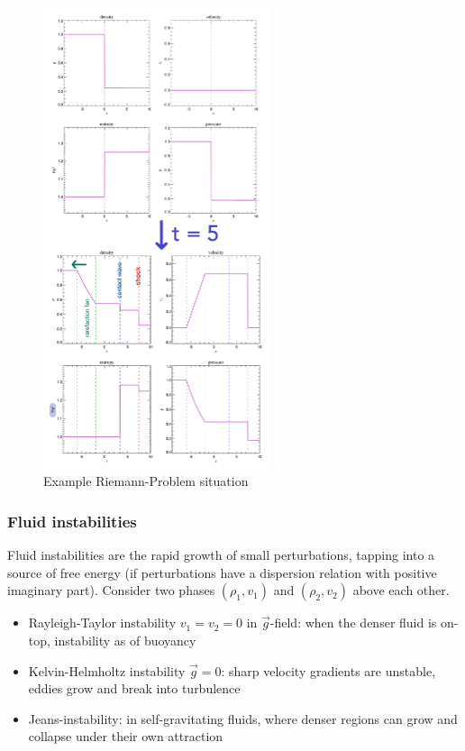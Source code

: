 \begin{figure}[htb!]
    \centering
    \includegraphics[width=0.6\textwidth]{figures/riemann_problem_example.pdf}
    \caption{Example Riemann-Problem situation}
    \label{fig:riemann_problem_example_s}
\end{figure}


\subsubsection*{Fluid instabilities}
Fluid instabilities are the rapid growth of small perturbations, tapping
into a source of free energy (if perturbations have a dispersion
relation with positive imaginary part). Consider two phases $(\rho_1,v_1)$ and
$(\rho_2,v_2)$ above each other.
\begin{itemize}
    \item Rayleigh-Taylor instability $v_1=v_2=0$ in $\vec{g}$-field: when the
    denser fluid is on-top, instability as of buoyancy
    \item Kelvin-Helmholtz instability $\vec{g} = 0$: sharp velocity gradients
    are unstable, eddies grow and break into turbulence
    \item Jeans-instability: in self-gravitating fluids, where denser regions can grow and collapse under their own attraction
\end{itemize}

